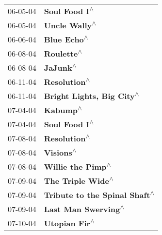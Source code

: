 \begin{supertabular}{p{0.25\columnwidth}p{0.75\columnwidth}}
 06-05-04 &                                                              \textbf{Soul Food I\textsuperscript{$\wedge$}} \\
 06-05-04 &                                                              \textbf{Uncle Wally\textsuperscript{$\wedge$}} \\
 06-06-04 &                                                                \textbf{Blue Echo\textsuperscript{$\wedge$}} \\
 06-08-04 &                                                                 \textbf{Roulette\textsuperscript{$\wedge$}} \\
 06-08-04 &                                                                   \textbf{JaJunk\textsuperscript{$\wedge$}} \\
 06-11-04 &                                                               \textbf{Resolution\textsuperscript{$\wedge$}} \\
 06-11-04 &                                                  \textbf{Bright Lights, Big City\textsuperscript{$\wedge$}} \\
 07-04-04 &                                                                   \textbf{Kabump\textsuperscript{$\wedge$}} \\
 07-04-04 &                                                              \textbf{Soul Food I\textsuperscript{$\wedge$}} \\
 07-08-04 &                                                               \textbf{Resolution\textsuperscript{$\wedge$}} \\
 07-08-04 &                                                                  \textbf{Visions\textsuperscript{$\wedge$}} \\
 07-08-04 &                                                          \textbf{Willie the Pimp\textsuperscript{$\wedge$}} \\
 07-09-04 &                                                          \textbf{The Triple Wide\textsuperscript{$\wedge$}} \\
 07-09-04 &                                              \textbf{Tribute to the Spinal Shaft\textsuperscript{$\wedge$}} \\
 07-09-04 &                                                        \textbf{Last Man Swerving\textsuperscript{$\wedge$}} \\
 07-10-04 &                                                              \textbf{Utopian Fir\textsuperscript{$\wedge$}} \\

\end{supertabular}
